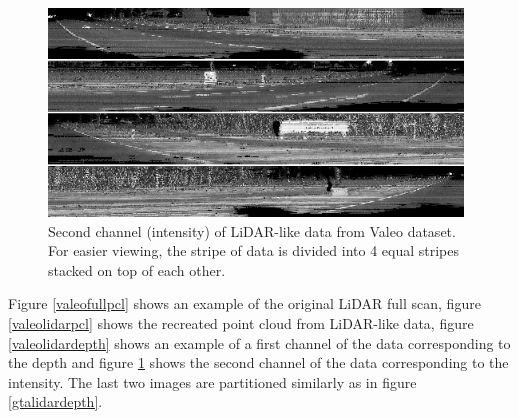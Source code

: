 \begin{figure}[H]
\centering
\includegraphics[width=0.98\textwidth,keepaspectratio]{img/valeolidarinten.png}
\caption[Second channel of LiDAR-like data from Valeo dataset]{Second channel (intensity) of LiDAR-like data from Valeo dataset. For easier viewing, the stripe of data is divided into 4 equal stripes stacked on top of each other.}
\label{valeolidarinten}
\end{figure}

Figure \ref{valeofullpcl} shows an example of the original LiDAR full scan, figure \ref{valeolidarpcl} shows the recreated point cloud from LiDAR-like data, figure \ref{valeolidardepth} shows an example of a first channel of the data corresponding to the depth and figure \ref{valeolidarinten} shows the second channel of the data corresponding to the intensity. The last two images are partitioned similarly as in figure \ref{gtalidardepth}.
